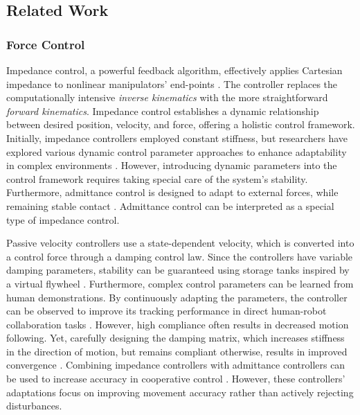 \subsection{Related Work}

\subsubsection{Force Control}
Impedance control, a powerful feedback algorithm, effectively applies Cartesian impedance to nonlinear manipulators' end-points \iflong \parencite{takegaki1981new, hogan1985impedance} \else \parencite{hogan1985impedance} \fi. The controller replaces the computationally intensive \textit{inverse kinematics} with the more straightforward \textit{forward kinematics}. Impedance control establishes a dynamic relationship between desired position, velocity, and force, offering a holistic control framework.
Initially, impedance controllers employed constant stiffness, but researchers have explored various dynamic control parameter approaches to enhance adaptability in complex environments \parencite{vanderborght2013variable, abu2020variable}. However, introducing dynamic parameters into the control framework requires taking special care of the system's stability.
Furthermore, admittance control is designed to adapt to external forces, while remaining stable contact \parencite{glosser1994implementation}. Admittance control can be interpreted as a special type of impedance control.

Passive velocity controllers use a state-dependent velocity, which is converted into a control force through a damping control law. Since the controllers have variable damping parameters, stability can be guaranteed using storage tanks inspired by a virtual flywheel \parencite{li1999passive}. 
Furthermore, complex control parameters can be learned from human demonstrations. By continuously adapting the parameters, the controller can be observed to improve its tracking performance in direct human-robot collaboration tasks \parencite{gribovskaya2011motion}.
However, high compliance often results in decreased motion following. Yet, carefully designing the damping matrix, which increases stiffness in the direction of motion, but remains compliant otherwise, results in improved convergence \parencite{kronander2015passive}. 
Combining impedance controllers with admittance controllers can be used to increase accuracy in cooperative control
\parencite{fujiki2022series}.
However, these controllers' adaptations focus on improving movement accuracy rather than actively rejecting disturbances.

